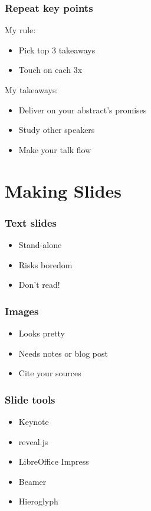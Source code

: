 \documentclass{beamer}
\begin{document}
\begin{frame}[fragile]
\frametitle{Repeat key points}
My rule:
\begin{itemize}
\item Pick top 3 takeaways
\item Touch on each 3x
\end{itemize}
My takeaways:
\begin{itemize}
\item Deliver on your abstract's promises
\item Study other speakers
\item Make your talk flow
\end{itemize}
\end{frame}

\section{Making Slides}

\begin{frame}[fragile]
\tableofcontents[currentsection]
\end{frame}

\begin{frame}[fragile]
\frametitle{Text slides}
\begin{itemize}
\item Stand-alone
\item Risks boredom
\item Don't read!
\end{itemize}
\end{frame}

\begin{frame}[fragile]
\frametitle{Images}
\begin{itemize}
\item Looks pretty
\item Needs notes or blog post
\item Cite your sources
\end{itemize}
\end{frame}

\begin{frame}[fragile]
\frametitle{Slide tools}
\begin{itemize}
\item Keynote
\item reveal.js
\item LibreOffice Impress
\item Beamer
\item Hieroglyph
\end{itemize}
\end{frame}
\end{document}
